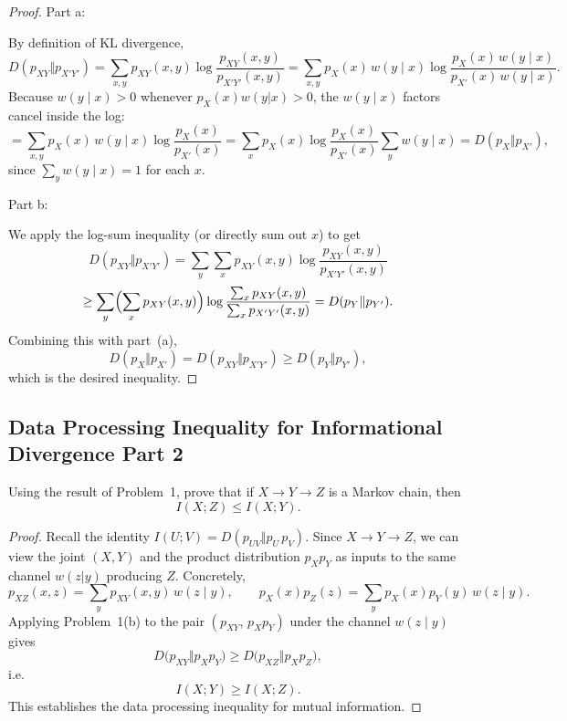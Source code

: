 \documentclass[../main.tex]{subfiles}
\begin{document}
\begin{proof}
Part a:

By definition of KL divergence,
\[
D(p_{XY}\Vert p_{X'Y'})
= \sum_{x,y} p_{XY}(x,y) \log \frac{p_{XY}(x,y)}{p_{X'Y'}(x,y)}
= \sum_{x,y} p_X(x)\,w(y\mid x) \log \frac{p_X(x)\,w(y\mid x)}{p_{X'}(x)\,w(y\mid x)}.
\]
Because $w(y\mid x)>0$ whenever $p_X(x)w(y|x)>0$, the $w(y\mid x)$ factors cancel inside the log:
\[
= \sum_{x,y} p_X(x)\,w(y\mid x) \log \frac{p_X(x)}{p_{X'}(x)}
= \sum_x p_X(x) \log \frac{p_X(x)}{p_{X'}(x)} \sum_y w(y\mid x)
= D(p_X\Vert p_{X'}),
\]
since $\sum_y w(y\mid x)=1$ for each $x$.


Part b:

We apply the log-sum inequality (or directly sum out $x$) to get
\[
D(p_{XY}\Vert p_{X'Y'})
= \sum_{y}\sum_x p_{XY}(x,y) \log \frac{p_{XY}(x,y)}{p_{X'Y'}(x,y)}
\]
\[
\ge \sum_y \Bigl(\sum_x p_{XY}(x,y)\Bigr) \log \frac{\sum_x p_{XY}(x,y)}{\sum_x p_{X'Y'}(x,y)}
= D(p_Y\Vert p_{Y'}).
\]
Combining this with part~(a),
\[
D(p_X\Vert p_{X'})=D(p_{XY}\Vert p_{X'Y'})\ge D(p_Y\Vert p_{Y'}),
\]
which is the desired inequality.
\end{proof}


\subsection*{Data Processing Inequality for Informational Divergence Part 2}

Using the result of Problem~1, prove that if $X\to Y\to Z$ is a Markov chain, then
\[I(X;Z) \le I(X;Y).
\]


\begin{proof}
Recall the identity $I(U;V)=D(p_{UV}\Vert p_U\,p_V)$.  Since $X\to Y\to Z$,
we can view the joint $(X,Y)$ and the product distribution $p_X p_Y$ as inputs to the same channel $w(z|y)$ producing $Z$.  Concretely,
\[
p_{XZ}(x,z) = \sum_y p_{XY}(x,y)\,w(z\mid y),
\qquad
p_X(x)p_Z(z) = \sum_y p_X(x)p_Y(y)\,w(z\mid y).
\]
Applying Problem~1(b) to the pair $(p_{XY},\,p_X p_Y)$ under the channel $w(z\mid y)$ gives
\[
D\bigl(p_{XY}\Vert p_X p_Y\bigr) \ge D\bigl(p_{XZ}\Vert p_X p_Z\bigr),
\]
i.e.
\[
I(X;Y) \ge I(X;Z).
\]
This establishes the data processing inequality for mutual information.
\end{proof}
\end{document}
